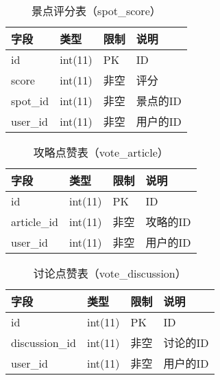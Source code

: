             \begin{table}[htbp]
                \caption{\wuhao 景点评分表（spot\_score）}
                \vspace{0.5em}\centering\wuhao
                \begin{tabular}{llll}
                    \toprule[1.5pt]
                    字段 & 类型 & 限制 & 说明\\
                    \midrule[1pt]
                    id & int(11) & PK & ID\\
                    score & int(11) & 非空 & 评分\\
                    spot\_id & int(11) & 非空 & 景点的ID\\
                    user\_id & int(11) & 非空 & 用户的ID\\
                    \bottomrule[1.5pt]
                \end{tabular}
            \end{table}

            \begin{table}[htbp]
                \caption{\wuhao 攻略点赞表（vote\_article）}
                \vspace{0.5em}\centering\wuhao
                \begin{tabular}{llll}
                    \toprule[1.5pt]
                    字段 & 类型 & 限制 & 说明\\
                    \midrule[1pt]
                    id & int(11) & PK & ID\\
                    article\_id & int(11) & 非空 & 攻略的ID\\
                    user\_id & int(11) & 非空 & 用户的ID\\
                    \bottomrule[1.5pt]
                \end{tabular}
            \end{table}

            \begin{table}[htbp]
                \caption{\wuhao 讨论点赞表（vote\_discussion）}
                \vspace{0.5em}\centering\wuhao
                \begin{tabular}{llll}
                    \toprule[1.5pt]
                    字段 & 类型 & 限制 & 说明\\
                    \midrule[1pt]
                    id & int(11) & PK & ID\\
                    discussion\_id & int(11) & 非空 & 讨论的ID\\
                    user\_id & int(11) & 非空 & 用户的ID\\
                    \bottomrule[1.5pt]
                \end{tabular}
            \end{table}

